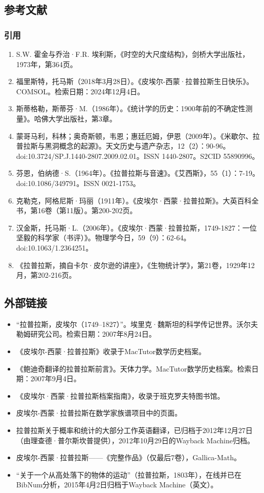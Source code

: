 \subsection{参考文献}  
\subsubsection{引用}  
\begin{enumerate}
\item S.W. 霍金与乔治·F.R. 埃利斯，《时空的大尺度结构》，剑桥大学出版社，1973年，第364页。  
\item 福里斯特，托马斯（2018年3月28日）。《皮埃尔-西蒙·拉普拉斯生日快乐》。COMSOL。检索日期：2024年12月4日。  
\item 斯蒂格勒，斯蒂芬·M.（1986年）。《统计学的历史：1900年前的不确定性测量》。哈佛大学出版社，第3章。  
\item 蒙哥马利，科林；奥奇斯顿，韦恩；惠廷厄姆，伊恩（2009年）。《米歇尔、拉普拉斯与黑洞概念的起源》。天文历史与遗产杂志，12（2）：90-96。doi:10.3724/SP.J.1440-2807.2009.02.01。ISSN 1440-2807。S2CID 55890996。  
\item 芬恩，伯纳德·S.（1964年）。《拉普拉斯与音速》。《艾西斯》，55（1）：7-19。doi:10.1086/349791。ISSN 0021-1753。  
\item 克勒克，阿格尼斯·玛丽（1911年）。《皮埃尔·西蒙·拉普拉斯》。大英百科全书，第16卷（第11版）。第200-202页。  
\item 汉金斯，托马斯·L.（2006年）。《皮埃尔·西蒙·拉普拉斯，1749-1827：一位坚毅的科学家（书评）》。物理学今日，59（9）：62-64。doi:10.1063/1.2364251。  
\item 《拉普拉斯，摘自卡尔·皮尔逊的讲座》，《生物统计学》，第21卷，1929年12月，第202-216页。

\end{enumerate}






\subsection{外部链接}
\begin{itemize}
\item “拉普拉斯，皮埃尔（1749–1827）”。埃里克·魏斯坦的科学传记世界。沃尔夫勒姆研究公司。检索日期：2007年8月24日。  
\item 《皮埃尔-西蒙·拉普拉斯》收录于MacTutor数学历史档案。  
\item 《鲍迪奇翻译的拉普拉斯前言》。天体力学。MacTutor数学历史档案。检索日期：2007年9月4日。  
\item 《皮埃尔·西蒙·拉普拉斯档案指南》，收录于班克罗夫特图书馆。  
\item 皮埃尔-西蒙·拉普拉斯在数学家族谱项目中的页面。  
\item 拉普拉斯关于概率和统计的大部分工作英语翻译，已归档于2012年12月27日（由理查德·普尔斯坎普提供），2012年10月29日的Wayback Machine归档。  
\item 皮埃尔-西蒙·拉普拉斯——《完整作品》（仅最后7卷），Gallica-Math。  
\item “关于一个从高处落下的物体的运动”（拉普拉斯，1803年），在线并已在BibNum分析，2015年4月2日归档于Wayback Machine（英文）。
\end{itemize}